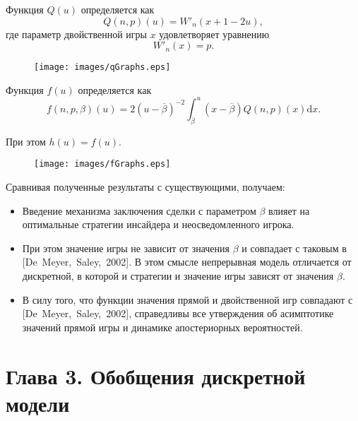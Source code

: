 \documentclass[12pt]{beamer}
\newcommand{\Co}{\beta}
\newcommand{\DCo}{\overline{\beta}}
\newcommand{\di}{\ensuremath{\mathrm{d}}}
\begin{document}
\begin{frame}
  Функция $Q(u)$ определяется как
  \begin{equation*}
    Q(n, p)(u) = W'_n(x + 1 - 2u),
  \end{equation*}
  где параметр двойственной игры $x$ удовлетворяет уравнению 
  \begin{equation*}
    W'_n(x) = p.
  \end{equation*}

  \begin{figure}[H!]
    \centering
    \texttt{[image: images/qGraphs.eps]}
  \end{figure}
\end{frame}

\begin{frame}
  Функция $f(u)$ определяется как
  \begin{equation*}
    f(n, p, \Co)(u) = 2 (u - \DCo)^{-2} \int_{\DCo}^u (x - \DCo) Q(n,p)(x) \di x.
  \end{equation*}
  
  При этом $h(u) = f(u)$.

  \begin{figure}[H!]
    \centering
    \texttt{[image: images/fGraphs.eps]}
  \end{figure}
\end{frame}

\begin{frame}
  Сравнивая полученные результаты с существующими, получаем:
  \begin{itemize}
  \item
    Введение механизма заключения сделки с параметром $\Co$ влияет на оптимальные стратегии инсайдера и неосведомленного игрока.
  \item
    При этом значение игры не зависит от значения $\Co$ и совпадает с таковым в [De~Meyer,~Saley,~2002].
    В этом смысле непрерывная модель отличается от дискретной, в которой и стратегии и значение игры зависят от значения $\Co$.
  \item
    В силу того, что функции значения прямой и двойственной игр совпадают с [De~Meyer,~Saley,~2002], справедливы все утверждения об асимптотике значений прямой игры и динамике апостериорных вероятностей.
  \end{itemize}
\end{frame}

\section{Глава 3. Обобщения дискретной модели}
\end{document}

